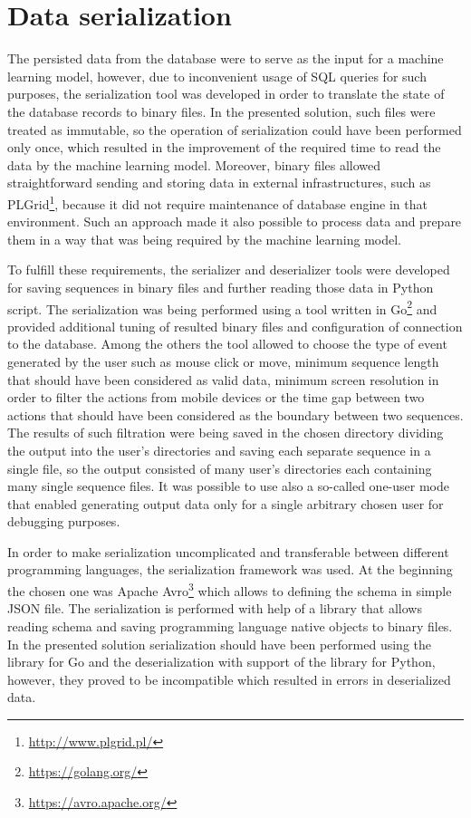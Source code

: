 
\section{Data serialization}\label{sec:data-serialization}
The persisted data from the database were to serve as the input for a machine learning model, however, due to inconvenient usage of SQL queries for such purposes, the serialization tool was developed in order to translate the state of the database records to binary files.
In the presented solution, such files were treated as immutable, so the operation of serialization could have been performed only once, which resulted in the improvement of the required time to read the data by the machine learning model.
Moreover, binary files allowed straightforward sending and storing data in external infrastructures, such as PLGrid\footnote{\url{http://www.plgrid.pl/}}, because it did not require maintenance of database engine in that environment.
Such an approach made it also possible to process data and prepare them in a way that was being required by the machine learning model.

To fulfill these requirements, the serializer and deserializer tools were developed for saving sequences in binary files and further reading those data in Python script.
The serialization was being performed using a tool written in Go\footnote{\url{https://golang.org/}} and provided additional tuning of resulted binary files and configuration of connection to the database.
Among the others the tool allowed to choose the type of event generated by the user such as mouse click or move, minimum sequence length that should have been considered as valid data, minimum screen resolution in order to filter the actions from mobile devices or the time gap between two actions that should have been considered as the boundary between two sequences.
The results of such filtration were being saved in the chosen directory dividing the output into the user's directories and saving each separate sequence in a single file, so the output consisted of many user's directories each containing many single sequence files.
It was possible to use also a so-called one-user mode that enabled generating output data only for a single arbitrary chosen user for debugging purposes.

In order to make serialization uncomplicated and transferable between different programming languages, the serialization framework was used.
At the beginning the chosen one was Apache Avro\footnote{\url{https://avro.apache.org/}} which allows to defining the schema in simple JSON file.
The serialization is performed with help of a library that allows reading schema and saving programming language native objects to binary files.
In the presented solution serialization should have been performed using the library for Go and the deserialization with support of the library for Python, however, they proved to be incompatible which resulted in errors in deserialized data.

